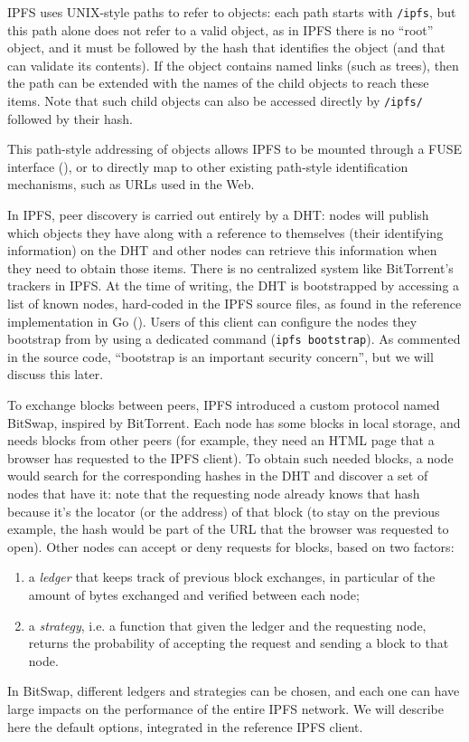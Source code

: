 \documentclass[mscthesis]{usiinfthesis}
\begin{document}
IPFS uses UNIX-style paths to refer to objects: each path starts with \texttt{/ipfs}, but this path alone does not refer to a valid object, as in IPFS there is no ``root'' object, and it must be followed by the hash that identifies the object (and that can validate its contents). If the object contains named links (such as trees), then the path can be extended with the names of the child objects to reach these items. Note that such child objects can also be accessed directly by \texttt{/ipfs/} followed by their hash.

This path-style addressing of objects allows IPFS to be mounted through a FUSE interface (\cite{website:fusegithub}), or to directly map to other existing path-style identification mechanisms, such as URLs used in the Web.

In IPFS, peer discovery is carried out entirely by a DHT: nodes will publish which objects they have along with a reference to themselves (their identifying information) on the DHT and other nodes can retrieve this information when they need to obtain those items. There is no centralized system like BitTorrent's trackers in IPFS.
At the time of writing, the DHT is bootstrapped by accessing a list of known nodes, hard-coded in the IPFS source files, as found in the reference implementation in Go (\cite{website:ipfsbootstrapsourcefile}). Users of this client can configure the nodes they bootstrap from by using a dedicated command (\texttt{ipfs bootstrap}). As commented in the source code, ``bootstrap is an important security concern'', but we will discuss this later.

To exchange blocks between peers, IPFS introduced a custom protocol named BitSwap, inspired by BitTorrent. Each node has some blocks in local storage, and needs blocks from other peers (for example, they need an HTML page that a browser has requested to the IPFS client). To obtain such needed blocks, a node would search for the corresponding hashes in the DHT and discover a set of nodes that have it: note that the requesting node already knows that hash because it's the locator (or the address) of that block (to stay on the previous example, the hash would be part of the URL that the browser was requested to open). Other nodes can accept or deny requests for blocks, based on two factors:
\begin{enumerate}
	\item a \emph{ledger} that keeps track of previous block exchanges, in particular of the amount of bytes exchanged and verified between each node;
	\item a \emph{strategy}, i.e. a function that given the ledger and the requesting node, returns the probability of accepting the request and sending a block to that node.
\end{enumerate}
In BitSwap, different ledgers and strategies can be chosen, and each one can have large impacts on the performance of the entire IPFS network. We will describe here the default options, integrated in the reference IPFS client.
\end{document}
